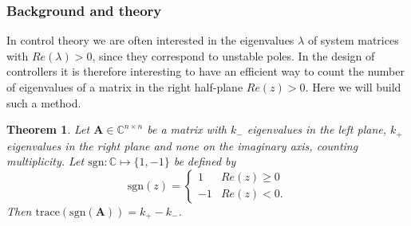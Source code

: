 \documentclass[11pt]{article}
\newtheorem{theorem}{Theorem}
\numberwithin{equation}{section}
\begin{document}
\subsubsection{Background and theory}
In control theory we are often interested in the eigenvalues $\lambda$ of system matrices with $Re(\lambda)>0$, since they correspond to unstable poles. In the design of controllers it is therefore interesting to have an efficient way to count the number of eigenvalues of a matrix in the right half-plane $Re(z)>0$. Here we will build such a method.
\begin{theorem}\label{thm:sign}
Let $\mathbf{A}\in\mathbb{C}^{n \times n}$ be a matrix with $k_{-}$ eigenvalues in the left plane, $k_{+}$ eigenvalues in the right plane and none on the imaginary axis, counting multiplicity. Let $\text{sgn}:\mathbb{C}\mapsto \{1,-1\}$ be defined by
$$\text{sgn}(z)= \begin{cases} 
      1 & Re(z)\geq 0 \\
      -1 & Re(z)<0. 
   \end{cases}
$$
Then $\text{trace}(\text{sgn}(\mathbf{A}))=k_{+}-k_{-}$.
\end{theorem}
\end{document}
